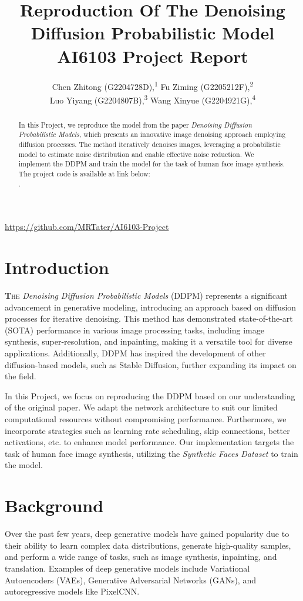 \documentclass[letterpaper]{article} %
\title{Reproduction Of The Denoising Diffusion Probabilistic Model \\ AI6103 Project Report}
\author {
    Chen Zhitong (G2204728D),\textsuperscript{\rm 1}
    Fu Ziming (G2205212F),\textsuperscript{\rm 2}\\
    Luo Yiyang (G2204807B),\textsuperscript{\rm 3}
    Wang Xinyue (G2204921G),\textsuperscript{\rm 4}
}
\begin{document}
\maketitle

\urldef{\myurl}\url{https://github.com/MRTater/AI6103-Project}
\begin{abstract}
In this Project, we reproduce the model from the paper \textit{Denoising Diffusion Probabilistic Models}, which presents an innovative image denoising approach employing diffusion processes. The method iteratively denoises images, leveraging a probabilistic model to estimate noise distribution and enable effective noise reduction. We implement the DDPM and train the model for the task of human face image synthesis. The project code is available at link below:\\
\myurl.
\end{abstract}

\section{Introduction}
\lettrine[lines=2, findent=3pt, nindent=0pt]{\textbf{T}}{he} \textit{Denoising Diffusion Probabilistic Models} (DDPM) represents a significant advancement in generative modeling, introducing an approach based on diffusion processes for iterative denoising. This method has demonstrated state-of-the-art (SOTA) performance in various image processing tasks, including image synthesis, super-resolution, and inpainting, making it a versatile tool for diverse applications. Additionally, DDPM has inspired the development of other diffusion-based models, such as Stable Diffusion, further expanding its impact on the field.

In this Project, we focus on reproducing the DDPM based on our understanding of the original paper. We adapt the network architecture to suit our limited computational resources without compromising performance. Furthermore, we incorporate strategies such as learning rate scheduling, skip connections, better activations, etc. to enhance model performance. Our implementation targets the task of human face image synthesis, utilizing the \textit{Synthetic Faces Dataset}\cite{david_beniaguev_2022} to train the model.

\section{Background}
Over the past few years, deep generative models have gained popularity due to their ability to learn complex data distributions, generate high-quality samples, and perform a wide range of tasks, such as image synthesis, inpainting, and translation. Examples of deep generative models include Variational Autoencoders (VAEs), Generative Adversarial Networks (GANs), and autoregressive models like PixelCNN.
\end{document}
